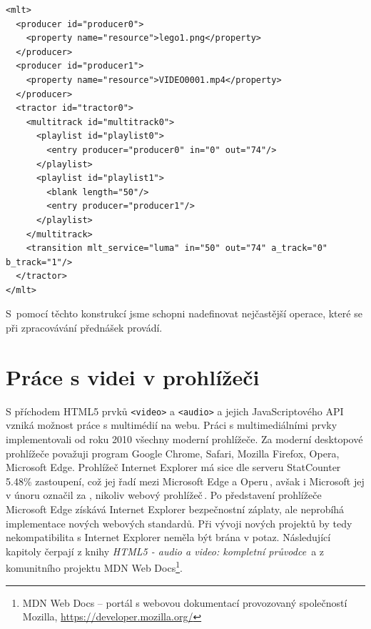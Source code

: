 \begin{lstlisting}[style=xml]
<mlt>
  <producer id="producer0">
    <property name="resource">lego1.png</property>
  </producer>
  <producer id="producer1">
    <property name="resource">VIDEO0001.mp4</property>
  </producer>
  <tractor id="tractor0">
    <multitrack id="multitrack0">
      <playlist id="playlist0">
        <entry producer="producer0" in="0" out="74"/>
      </playlist>
      <playlist id="playlist1">
        <blank length="50"/>
        <entry producer="producer1"/>
      </playlist>
    </multitrack>
    <transition mlt_service="luma" in="50" out="74" a_track="0" b_track="1"/>
  </tractor>
</mlt>
\end{lstlisting}

S~pomocí těchto konstrukcí jsme schopni nadefinovat nejčastější operace, které se při zpracovávání přednášek provádí.

\section{Práce s videi v prohlížeči}
S příchodem HTML5 prvků \texttt{<video>} a \texttt{<audio>} a jejich JavaScriptového API vzniká možnost práce s multimédií na webu. Práci s multimediálními prvky implementovali od roku 2010 všechny moderní prohlížeče. Za moderní desktopové prohlížeče považuji program Google Chrome, Safari, Mozilla Firefox, Opera, Microsoft Edge. Prohlížeč Internet Explorer má sice dle serveru StatCounter 5.48\% zastoupení, což jej řadí mezi Microsoft Edge a Operu\,\cite{statcounter}, avšak i Microsoft jej v únoru označil za , nikoliv webový prohlížeč\,\cite{internetExplorer}. Po představení prohlížeče Microsoft Edge získává Internet Explorer bezpečnostní záplaty, ale neprobíhá implementace nových webových standardů. Při vývoji nových projektů by tedy nekompatibilita s Internet Explorer neměla být brána v potaz. Následující kapitoly čerpají z knihy \textit{HTML5 - audio a video: kompletní průvodce}\,\cite{HTML5multimedia} a z komunitního projektu MDN Web Docs\footnote{MDN Web Docs -- portál s webovou dokumentací provozovaný společností Mozilla, \url{https://developer.mozilla.org/}}.

